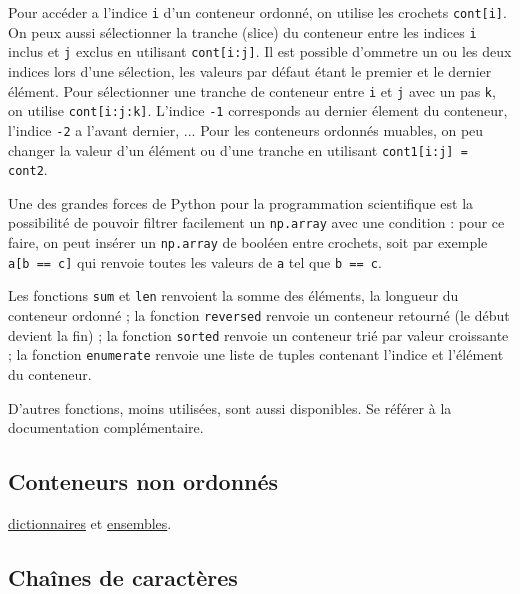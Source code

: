 \documentclass{article}
\begin{document}
Pour accéder a l'indice \texttt{i} d'un conteneur ordonné, on utilise les crochets \texttt{cont[i]}. On peux aussi sélectionner la tranche (slice) du conteneur entre les indices \texttt{i} inclus et \texttt{j} exclus en utilisant \texttt{cont[i:j]}. Il est possible d'ommetre un ou les deux indices lors d'une sélection, les valeurs par défaut étant le premier et le dernier élément. Pour sélectionner une tranche de conteneur entre \texttt{i} et \texttt{j} avec un pas \texttt{k}, on utilise \texttt{cont[i:j:k]}. L'indice \texttt{-1} corresponds au dernier élement du conteneur, l'indice \texttt{-2} a l'avant dernier, ... Pour les conteneurs ordonnés muables, on peu changer la valeur d'un élément ou d'une tranche en utilisant \texttt{cont1[i:j] = cont2}.

Une des grandes forces de Python pour la programmation scientifique est la possibilité de pouvoir filtrer facilement un \texttt{np.array} avec une condition : pour ce faire, on peut insérer un \texttt{np.array} de booléen entre crochets, soit par exemple \texttt{a[b == c]} qui renvoie toutes les valeurs de \texttt{a} tel que \texttt{b == c}.

Les fonctions \texttt{sum} et \texttt{len} renvoient la somme des éléments, la longueur du conteneur ordonné ; la fonction \texttt{reversed} renvoie un conteneur retourné (le début devient la fin) ; la fonction \texttt{sorted} renvoie un conteneur trié par valeur croissante ; la fonction \texttt{enumerate} renvoie une liste de tuples contenant l'indice et l'élément du conteneur.

D'autres fonctions, moins utilisées, sont aussi disponibles. Se référer à la documentation complémentaire.

\subsection*{Conteneurs non ordonnés}
 \href{https://fr.wikibooks.org/wiki/Programmation_Python/Dictionnaires}{dictionnaires} et \href{https://fr.wikibooks.org/wiki/Programmation_Python/Ensembles}{ensembles}.
 
\subsection*{Chaînes de caractères}
\end{document}
